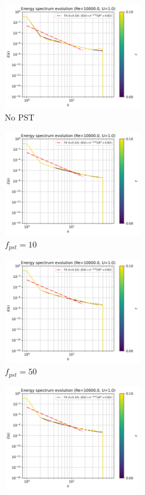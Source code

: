 \begin{figure}[htbp!]
  \begin{subfigure}{7cm}
    \centering\includegraphics[width=6cm]{Code-Figures/deltales/pst/c0_20_tait_pec_dtmul_1_nx_100_pst_-1_re_10000_deltales/energy_spectrum_evolution.png}
    \caption{No PST}
  \end{subfigure}
  \begin{subfigure}{7cm}
    \centering\includegraphics[width=6cm]{Code-Figures/deltales/pst/c0_20_tait_pec_dtmul_1_nx_100_pst_10_re_10000_deltales/energy_spectrum_evolution.png}
    \caption{$f_{pst} = 10$}
  \end{subfigure}
  \begin{subfigure}{7cm}
    \centering\includegraphics[width=6cm]{Code-Figures/deltales/pst/c0_20_tait_pec_dtmul_1_nx_100_pst_50_re_10000_deltales/energy_spectrum_evolution.png}
    \caption{$f_{pst} = 50$}
  \end{subfigure}
  \begin{subfigure}{7cm}
    \centering\includegraphics[width=6cm]{Code-Figures/deltales/pst/c0_20_tait_pec_dtmul_1_nx_100_pst_100_re_10000_deltales/energy_spectrum_evolution.png}

\end{subfigure}
\end{figure}
